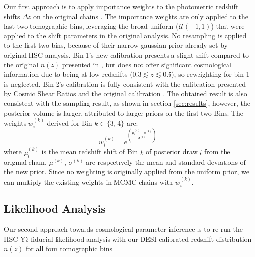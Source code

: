 Our first approach is to apply importance weights to the photometric redshift shifts $\Delta z$ on the original chains \cite{Li2023_HSCY3_CosmicShear}. The importance weights are only applied to the last two tomographic bins, leveraging the broad uniform ($\mathcal{U}(-1,1)$) that were applied to the shift parameters in the original analysis. No resampling is applied to the first two bins, because of their narrow gaussian prior already set by original HSC analysis. Bin 1's new calibration presents a slight shift compared to the original $n(z)$ presented in \cite{HSCClusteringRau2023}, but does not offer significant cosmological information due to being at low redshifts ($0.3\lesssim z\lesssim0.6$), so reweighting for bin 1 is neglected. Bin 2's calibration is fully consistent with the calibration presented by Cosmic Shear Ratios \cite{Rana2025HSCY3CosmicShearRatios} and the original calibration \cite{HSCClusteringRau2023}. The obtained result is also consistent with the sampling result, as shown in section \ref{sec:results}, however, the posterior volume is larger, attributed to larger priors on the first two Bins. The weights $w^{(k)}_i$ derived for Bin $k\in\{3,\,4\}$ are:
\begin{equation}
    w^{(k)}_i=e^{\left(\frac{\mu^{(k)}_i-\mu^{(k)}}{\sigma^{(k)}}\right)}
\end{equation}
where $\mu^{(k)}_i$ is the mean redshift shift of Bin $k$ of posterior draw $i$ from the original chain, $\mu^{(k)}$, $\sigma^{(k)}$ are respectively the mean and standard deviations of the new prior. Since no weighting is originally applied from the uniform prior, we can multiply the existing weights in MCMC chains with $w^{(k)}_i$.

\subsection{Likelihood Analysis}
\label{sec:method:mcmc}

Our second approach towards cosmological parameter inference is to re-run the HSC Y3 fiducial likelihood analysis with our DESI-calibrated redshift distribution $n(z)$ for all four tomographic bins. 

